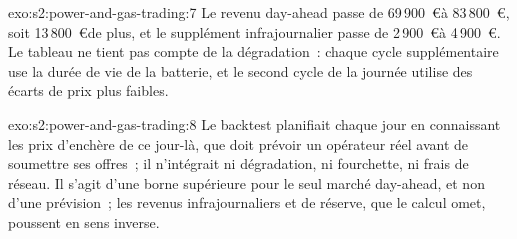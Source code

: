\begin{solution}{exo:s2:power-and-gas-trading:7}
Le revenu day-ahead passe de 69\,900~\euro à 83\,800~\euro, soit 13\,800~\euro de plus, et le supplément infrajournalier passe de 2\,900~\euro à 4\,900~\euro. Le tableau ne tient pas compte
de la dégradation~: chaque cycle supplémentaire use la durée de vie de la batterie, et le second cycle de la journée utilise des écarts de prix plus faibles.
\end{solution}

\begin{solution}{exo:s2:power-and-gas-trading:8}
Le backtest planifiait chaque jour en connaissant les prix d'enchère de ce jour-là, que doit prévoir un opérateur réel avant de soumettre ses offres~; il n'intégrait ni dégradation, ni
fourchette, ni frais de réseau. Il s'agit d'une borne supérieure pour le seul marché day-ahead, et non d'une prévision~; les revenus infrajournaliers et de réserve, que le calcul omet,
poussent en sens inverse.
\end{solution}

